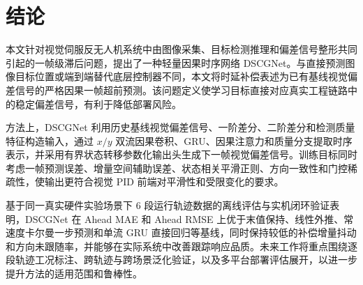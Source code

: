 \documentclass[journal]{IEEEtran}
\begin{document}
\section{结论}
本文针对视觉伺服反无人机系统中由图像采集、目标检测推理和偏差信号整形共同引起的一帧级滞后问题，提出了一种轻量因果时序网络 DSCGNet。与直接预测图像目标位置或端到端替代底层控制器不同，本文将时延补偿表述为已有基线视觉偏差信号的严格因果一帧超前预测。该问题定义使学习目标直接对应真实工程链路中的稳定偏差信号，有利于降低部署风险。

方法上，DSCGNet 利用历史基线视觉偏差信号、一阶差分、二阶差分和检测质量特征构造输入，通过 $x/y$ 双流因果卷积、GRU、因果注意力和质量分支提取时序表示，并采用有界状态转移参数化输出头生成下一帧视觉偏差信号。训练目标同时考虑一帧预测误差、增量空间辅助误差、状态相关平滑正则、方向一致性和门控稀疏性，使输出更符合视觉 PID 前端对平滑性和受限变化的要求。

基于同一真实硬件实验场景下 6 段运行轨迹数据的离线评估与实机闭环验证表明，DSCGNet 在 Ahead MAE 和 Ahead RMSE 上优于末值保持、线性外推、常速度卡尔曼一步预测和单流 GRU 直接回归等基线，同时保持较低的补偿增量抖动和方向未跟随率，并能够在实际系统中改善跟踪响应品质。未来工作将重点围绕逐段轨迹工况标注、跨轨迹与跨场景泛化验证，以及多平台部署评估展开，以进一步提升方法的适用范围和鲁棒性。
\end{document}
